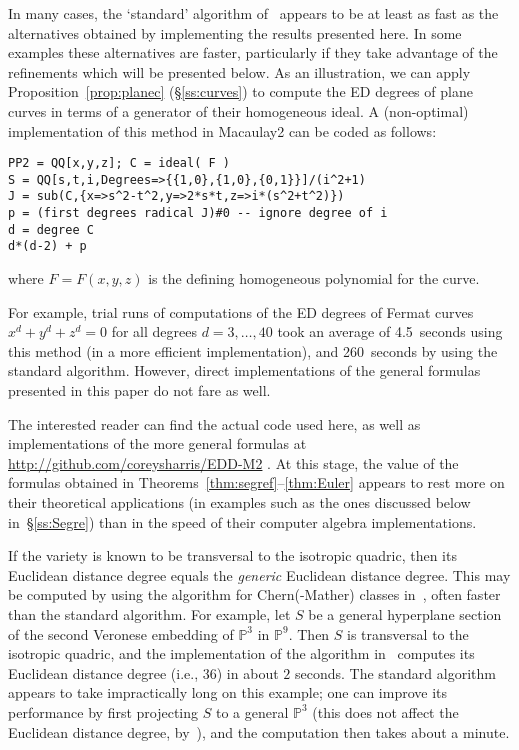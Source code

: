 \documentclass[11pt]{amsart}
\numberwithin{equation}{section}
\newcommand{\Pbb}{{\mathbb{P}}}
\begin{document}
In many cases, the `standard' algorithm 
of~\cite[Example 2.11]{MR3451425} appears to be at least as fast as the alternatives
obtained by implementing the results presented here. In some examples these
alternatives are faster, particularly if they take advantage of the refinements which
will be presented below. As an illustration, we can apply Proposition~\ref{prop:planec}
(\S\ref{ss:curves}) to compute the ED degrees of plane curves in terms of a generator 
of their homogeneous ideal.
A (non-optimal) implementation of this method in \textrm{Macaulay2} can be coded 
as follows:
\begin{verbatim}
PP2 = QQ[x,y,z]; C = ideal( F )
S = QQ[s,t,i,Degrees=>{{1,0},{1,0},{0,1}}]/(i^2+1)
J = sub(C,{x=>s^2-t^2,y=>2*s*t,z=>i*(s^2+t^2)})
p = (first degrees radical J)#0 -- ignore degree of i
d = degree C
d*(d-2) + p
\end{verbatim}
where $F=F(x,y,z)$ is the defining homogeneous polynomial for the curve. 

For example, trial runs of computations of the ED degrees of Fermat curves
$x^d+y^d+z^d=0$ for all degrees $d=3,\dots, 40$ took an average of 4.5~seconds
using this method (in a more efficient implementation), and 260~seconds by using 
the standard algorithm. However, direct implementations of the general formulas 
presented in this paper do not fare as well.

The interested reader can find the actual code used here, as well as implementations
of the more general formulas at \url{http://github.com/coreysharris/EDD-M2} .
At this stage, the value of the
formulas obtained in Theorems~\ref{thm:segref}--\ref{thm:Euler} 
appears to rest more on their theoretical applications (in examples such as
the ones discussed below in~\S\ref{ss:Segre}) than in the speed of their computer algebra
implementations.

If the variety is known to be transversal to the isotropic quadric, then its Euclidean
distance degree equals the {\em generic\/} Euclidean distance degree. This may
be computed by using the algorithm for Chern(-Mather) classes in~\cite{Harris201726},
often faster than the standard algorithm. For example, let $S$ be a general hyperplane
section of the second Veronese embedding of $\Pbb^3$ in $\Pbb^9$. Then $S$ is
transversal to the isotropic quadric, and the implementation of the algorithm 
in~\cite{Harris201726} computes its Euclidean distance degree (i.e., $36$) in about 
$2$ seconds. The standard algorithm appears to take impractically long on this 
example; one can improve its performance by first projecting $S$ to a general $\Pbb^3$
(this does not affect the Euclidean distance degree,
by~\cite[Corollary~6.1]{MR3451425}), and the computation then takes about a minute. 
\end{document}
